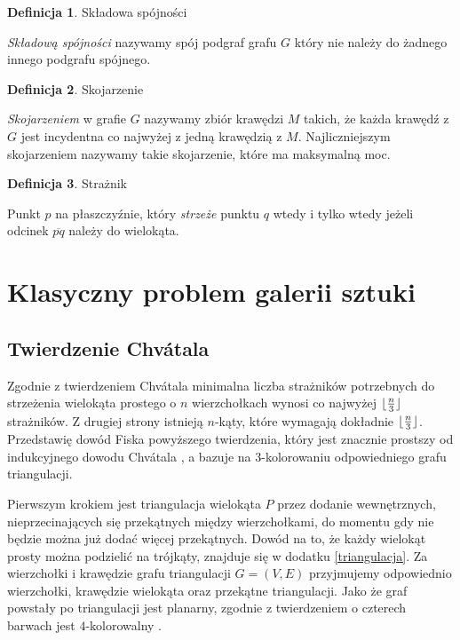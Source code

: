 \documentclass[brudnopis]{xmgr}
\DeclarePairedDelimiter\floor{\lfloor}{\rfloor}
\theoremstyle{definition}
\newtheorem{Definicja}{Definicja}
\begin{document}
\begin{Definicja}{Składowa spójności}
  
  \emph{Składową spójności} nazywamy spój podgraf grafu $G$ który nie należy do żadnego innego podgrafu spójnego.
\end{Definicja}

\begin{Definicja}{Skojarzenie}

  \emph{Skojarzeniem} w grafie $G$ nazywamy zbiór krawędzi $M$ takich, że każda krawędź z $G$ jest incydentna co najwyżej z jedną krawędzią z $M$. Najliczniejszym skojarzeniem nazywamy takie skojarzenie, które ma maksymalną moc.   
\end{Definicja}

\begin{Definicja}{Strażnik}

  Punkt $p$ na płaszczyźnie, który \emph{strzeże} punktu $q$ wtedy i tylko wtedy jeżeli odcinek $\overline{pq}$ należy do wielokąta.
\end{Definicja}

\chapter{Klasyczny problem galerii sztuki}

\section{Twierdzenie Chv\'atala}\label{sec:klasyczny}
Zgodnie z twierdzeniem Chv\'atala \cite{chvatal} \label{tw chvatala} minimalna liczba strażników potrzebnych do strzeżenia wielokąta prostego o $n$ wierzchołkach wynosi co najwyżej $\floor{\frac{n}{3}}$ strażników.
Z drugiej strony istnieją $n$-kąty, które wymagają dokładnie $\floor{\frac{n}{3}}$.
\\\indent Przedstawię dowód Fiska \cite{fisk} powyższego twierdzenia, który jest znacznie prostszy od indukcyjnego dowodu Chv\'atala \cite{chvatal}, a bazuje na $3$-kolorowaniu odpowiedniego grafu triangulacji. 

Pierwszym krokiem jest triangulacja wielokąta $P$ przez dodanie wewnętrznych, nieprzecinających się przekątnych między wierzchołkami, do momentu gdy nie będzie można już dodać więcej przekątnych. 
Dowód na to, że każdy wielokąt prosty można podzielić na trójkąty, znajduje się w dodatku \ref{triangulacja}.
Za wierzchołki i krawędzie grafu triangulacji $G=(V,E)$ przyjmujemy odpowiednio wierzchołki, krawędzie wielokąta oraz przekątne triangulacji. Jako że graf powstały po triangulacji jest planarny, zgodnie z twierdzeniem o czterech barwach jest $4$-kolorowalny \cite{appel}.
\end{document}

